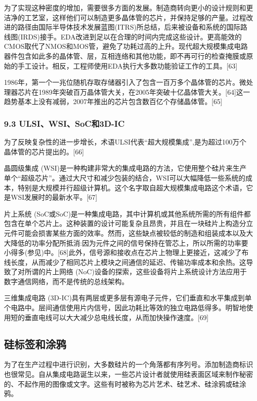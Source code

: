 为了实现这种密度的增加，需要很多方面的发展。制造商转向更小的设计规则和更洁净的工艺室，这样他们可以制造更多晶体管的芯片，并保持足够的产量。过程改进的路径由国际半导体技术发展蓝图(ITRS)所总结，后来被设备和系统的国际路线图(IRDS)接手。EDA改进到足以在合理的时间内完成这些设计。更高能效的CMOS取代了NMOS和MOS管，避免了功耗过高的上升。现代超大规模集成电路器件包含如此多的晶体管、层，互相连络和其他功能，即不再可行的检查掩膜或原始的手工设计。相反，工程师使用EDA执行大多数功能验证工作的工具。[63]

1986年，第一个一兆位随机存取存储器引入了包含一百万多个晶体管的芯片。微处理器芯片在1989年突破百万晶体管大关，在2005年突破十亿晶体管大关。[64]这一趋势基本上没有减弱，2007年推出的芯片包含数百亿个存储晶体管。[65]

\subsubsection{9.3 ULSI、WSI、SoC和3D-IC}

为了反映复杂性的进一步增长，术语ULSI代表“超大规模集成”,是为超过100万个晶体管的芯片提出的。[66]

晶圆级集成 (WSI)是一种构建非常大的集成电路的方法，它使用整个硅片来生产单个“超级芯片”。通过大尺寸和减少包装的结合，WSI可以大幅降低一些系统的成本，特别是大规模并行超级计算机。这个名字取自超大规模集成电路这个术语，它是WSI发展时的最新水平。[67]

片上系统 (SoC或SoC)是一种集成电路，其中计算机或其他系统所需的所有组件都包含在单个芯片上。这种装置的设计可能复杂且昂贵，并且在一块硅片上构造分立元件可能会损害某些方面的效率。然而，这些缺点被较低的制造和组装成本以及大大降低的功率分配所抵消:因为元件之间的信号保持在管芯上，所以所需的功率要小得多(参见)中。[68]此外，信号源和接收点在芯片上物理上更接近，这减少了布线长度，从而减少了相同芯片上模块之间通信的延迟、传输功率成本和余热。这导致了对所谓的片上网络 (NoC)设备的探索，这些设备将片上系统设计方法应用于数字通信网络，而不是传统的总线架构。

三维集成电路 (3D-IC)具有两层或更多层有源电子元件，它们垂直和水平集成到单个电路中。层间通信使用片内信号，因此功耗比等效的独立电路低得多。明智地使用短的垂直电线可以大大减少总电线长度，从而加快操作速度。[69]

\subsection{硅标签和涂鸦}

为了在生产过程中进行识别，大多数硅片的一个角落都有序列号。添加制造商标识也很常见。自从集成电路诞生以来，一些芯片设计者就使用硅表面区域来制作秘密的、不起作用的图像或文字。这些有时被称为芯片艺术、硅艺术、硅涂鸦或硅涂鸦。


